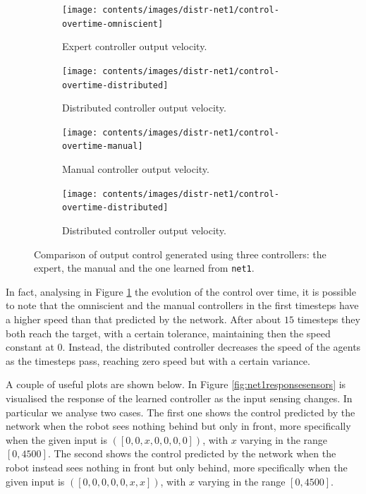 \begin{figure}[!htb]
	\centering
	\begin{subfigure}[h]{0.49\textwidth}
		\centering
		\texttt{[image: contents/images/distr-net1/control-overtime-omniscient]}%
		\caption{Expert controller output velocity.}
	\end{subfigure}
	\hfill
	\begin{subfigure}[h]{0.49\textwidth}
		\centering
		\texttt{[image: contents/images/distr-net1/control-overtime-distributed]}
		\caption{Distributed controller output velocity.}
	\end{subfigure}
	
	\hspace*{\fill}%
	
	\vspace*{8pt}%
	
	\hspace*{\fill}%
	\begin{subfigure}[h]{0.49\textwidth}
		\centering
		\texttt{[image: contents/images/distr-net1/control-overtime-manual]}%
		\caption{Manual controller output velocity.}
	\end{subfigure}
	\hfill
	\begin{subfigure}[h]{0.49\textwidth}
		\centering
		\texttt{[image: contents/images/distr-net1/control-overtime-distributed]}
		\caption{Distributed controller output velocity.}
	\end{subfigure}
	\caption[Evaluation of the control learned by \texttt{net1}.]{Comparison 
		of output control generated using three controllers: the expert, the manual 
		and the one learned from \texttt{net1}.}
	\label{fig:net1control}
\end{figure}

In fact, analysing in Figure \ref{fig:net1control} the evolution of the control over 
time, it is possible to note that the omniscient and the manual controllers in the 
first timesteps have a higher speed than that predicted by the network. After 
about $15$ timesteps they both reach the target, with a certain tolerance, 
maintaining then the speed constant at $0$. Instead, the distributed controller 
decreases the speed of the agents as the timesteps pass, reaching zero speed but 
with a certain variance.

A couple of useful plots are shown below.
In Figure \ref{fig:net1responsesensors} is visualised the response of the learned 
controller as the input sensing changes. In particular we analyse two cases. The 
first one shows the control predicted by the network when the robot sees nothing 
behind but only in front, more specifically when the given input is  $([0, 0, x, 0, 0, 
0, 0])$, with $x$ varying in the range $[0, 4500]$.
The second shows the control predicted by the network when the robot instead 
sees nothing in front but only behind, more specifically when the given input is  
$([0, 0, 0, 0, 0,x , x])$, with $x$ varying in the range $[0, 4500]$.

